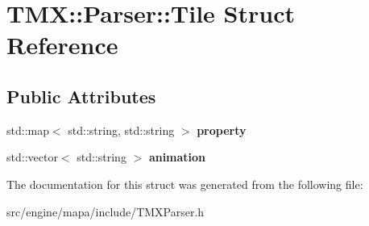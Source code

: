 \hypertarget{struct_t_m_x_1_1_parser_1_1_tile}{}\section{T\+MX\+:\+:Parser\+:\+:Tile Struct Reference}
\label{struct_t_m_x_1_1_parser_1_1_tile}
\subsection*{Public Attributes}
\begin{DoxyCompactItemize}
\item 
std\+::map$<$ std\+::string, std\+::string $>$ {\bfseries property}\hypertarget{struct_t_m_x_1_1_parser_1_1_tile_ac71d2243699b03f2a8c5d3922fd2dfdf}{}\label{struct_t_m_x_1_1_parser_1_1_tile_ac71d2243699b03f2a8c5d3922fd2dfdf}

\item 
std\+::vector$<$ std\+::string $>$ {\bfseries animation}\hypertarget{struct_t_m_x_1_1_parser_1_1_tile_a9f4a39ec53888721361cf1733c4537c7}{}\label{struct_t_m_x_1_1_parser_1_1_tile_a9f4a39ec53888721361cf1733c4537c7}

\end{DoxyCompactItemize}


The documentation for this struct was generated from the following file\+:\begin{DoxyCompactItemize}
\item 
src/engine/mapa/include/T\+M\+X\+Parser.\+h\end{DoxyCompactItemize}
